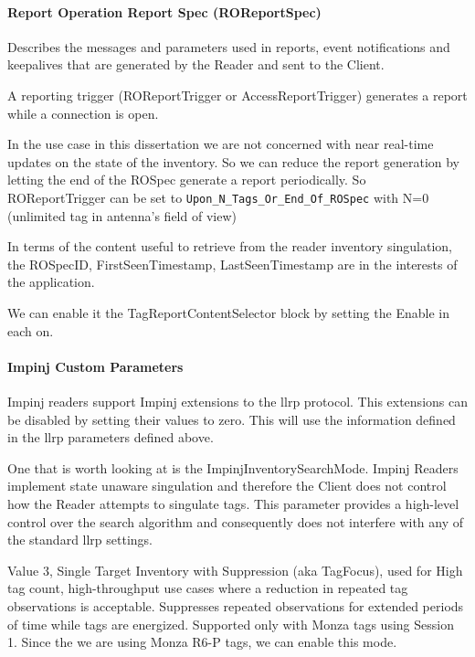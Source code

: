 \paragraph{Report Operation Report Spec (ROReportSpec)}

Describes the messages and parameters used in reports, event notifications and keepalives that are generated by the Reader and sent to the Client.

A reporting trigger (ROReportTrigger or AccessReportTrigger) generates a report while a connection is open.

In the use case in this dissertation we are not concerned with near real-time updates on the state of the inventory. So we can reduce the report generation by letting the end of the ROSpec generate a report periodically.
So ROReportTrigger can be set to \texttt{Upon\_N\_Tags\_Or\_End\_Of\_ROSpec} with N=0 (unlimited tag in antenna's field of view)~\cite[sec. 14.2.1]{LowLevelReader}

In terms of the content useful to retrieve from the reader inventory singulation, the ROSpecID, FirstSeenTimestamp, LastSeenTimestamp are in the interests of the application.

We can enable it the TagReportContentSelector block by setting the Enable in each on.

\paragraph{Impinj Custom Parameters}

Impinj readers support Impinj extensions to the \ac{llrp} protocol. This extensions can be disabled by setting their values to zero. This will use the information defined in the \ac{llrp} parameters defined above.

One that is worth looking at is the ImpinjInventorySearchMode.
Impinj Readers implement state unaware singulation and therefore the Client does not control how the Reader attempts to singulate tags. This parameter provides a high-level control over the search algorithm and consequently does not interfere with any of the standard \ac{llrp} settings.~\cite[sec. 4.3.3]{ImpinjOctaneLLRP}

Value 3, Single Target Inventory with Suppression (aka TagFocus), used for High tag count, high-throughput use cases where a reduction in repeated tag observations is acceptable. Suppresses repeated observations for extended periods of time while tags are energized. Supported only with Monza tags using Session 1. Since the we are using Monza R6-P tags, we can enable this mode.

